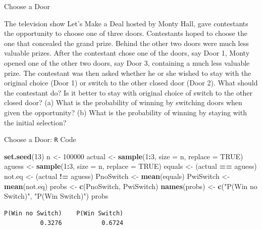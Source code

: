 \documentclass[
  ignorenonframetext,
]{beamer}
\newenvironment{Shaded}{\begin{snugshade}}{\end{snugshade}}
\newcommand{\AttributeTok}[1]{\textcolor[rgb]{0.13,0.29,0.53}{#1}}
\newcommand{\ConstantTok}[1]{\textcolor[rgb]{0.56,0.35,0.01}{#1}}
\newcommand{\DecValTok}[1]{\textcolor[rgb]{0.00,0.00,0.81}{#1}}
\newcommand{\FunctionTok}[1]{\textcolor[rgb]{0.13,0.29,0.53}{\textbf{#1}}}
\newcommand{\NormalTok}[1]{#1}
\newcommand{\OtherTok}[1]{\textcolor[rgb]{0.56,0.35,0.01}{#1}}
\newcommand{\SpecialCharTok}[1]{\textcolor[rgb]{0.81,0.36,0.00}{\textbf{#1}}}
\newcommand{\StringTok}[1]{\textcolor[rgb]{0.31,0.60,0.02}{#1}}
\begin{document}
\begin{frame}{Choose a Door}
\label{choose-a-door}
\begin{tcolorbox}
The television show Let's Make a Deal hosted by Monty Hall, gave contestants the opportunity to choose one of three doors. Contestants hoped to choose the one that concealed the grand prize. Behind the other two doors were much less valuable prizes. After the contestant chose one of the doors, say Door 1, Monty opened one of the other two doors, say Door 3, containing a much less valuable prize. The contestant was then asked whether he or she wished to stay with the original choice (Door 1) or switch to the other closed door (Door 2). What should the contestant do? Is it better to stay with original choice of switch to the other closed door? (a) What is the probability of winning by switching doors when given the opportunity? (b) What is the probability of winning by staying with the initial selection?


\end{tcolorbox}
\end{frame}

\begin{frame}[fragile]{Choose a Door: \texttt{R} Code}
\label{choose-a-door-r-code}
\small

\begin{Shaded}
\begin{Highlighting}[]
\FunctionTok{set.seed}\NormalTok{(}\DecValTok{13}\NormalTok{)}
\NormalTok{n }\OtherTok{\textless{}{-}} \DecValTok{100000}
\NormalTok{actual }\OtherTok{\textless{}{-}} \FunctionTok{sample}\NormalTok{(}\DecValTok{1}\SpecialCharTok{:}\DecValTok{3}\NormalTok{, }\AttributeTok{size =}\NormalTok{ n, }\AttributeTok{replace =} \ConstantTok{TRUE}\NormalTok{)}
\NormalTok{aguess }\OtherTok{\textless{}{-}} \FunctionTok{sample}\NormalTok{(}\DecValTok{1}\SpecialCharTok{:}\DecValTok{3}\NormalTok{, }\AttributeTok{size =}\NormalTok{ n, }\AttributeTok{replace =} \ConstantTok{TRUE}\NormalTok{)}
\NormalTok{equals }\OtherTok{\textless{}{-}}\NormalTok{ (actual }\SpecialCharTok{==}\NormalTok{ aguess)}
\NormalTok{not.eq }\OtherTok{\textless{}{-}}\NormalTok{ (actual }\SpecialCharTok{!=}\NormalTok{ aguess)}
\NormalTok{PnoSwitch }\OtherTok{\textless{}{-}} \FunctionTok{mean}\NormalTok{(equals)}
\NormalTok{PwiSwitch }\OtherTok{\textless{}{-}} \FunctionTok{mean}\NormalTok{(not.eq)}
\NormalTok{probs }\OtherTok{\textless{}{-}} \FunctionTok{c}\NormalTok{(PnoSwitch, PwiSwitch)}
\FunctionTok{names}\NormalTok{(probs) }\OtherTok{\textless{}{-}} \FunctionTok{c}\NormalTok{(}\StringTok{"P(Win no Switch)"}\NormalTok{, }\StringTok{"P(Win Switch)"}\NormalTok{)}
\NormalTok{probs}
\end{Highlighting}
\end{Shaded}

\begin{verbatim}
P(Win no Switch)    P(Win Switch) 
          0.3276           0.6724 
\end{verbatim}

\normalsize
\end{frame}
\end{document}
